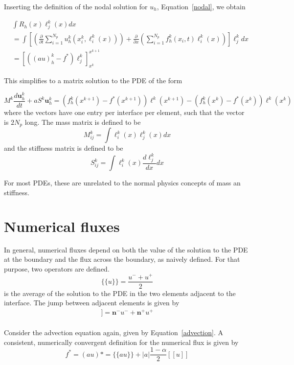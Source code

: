 \documentclass{article}
\begin{document}
Inserting the definition of the nodal solution for $u_h$,
Equation~\ref{nodal}, we obtain

\begin{eqnarray}
&\int R_h(x)\ell_j^k(x)dx\\
&=\displaystyle\int\left[\left(\frac{\partial}{\partial t}\sum_{i=1}^{N_p}
u_h^k(x_i^k,\ell_i^k(x))\right)
+\frac{\partial}{\partial x}\left(\sum_{i=1}^{N_p}f_h^k(x_i,t)\ell_i^k(x)\right)\right]\ell_j^kdx\\
&=[((au)_h^k-f^*)\ell_j^k]_{x^k}^{x^{k+1}}
\end{eqnarray}

This simplifies to a matrix solution to the PDE of the form

\begin{equation}
M^k\frac{d\boldsymbol{u}_h^k}{dt}+aS^k\boldsymbol{u}^k_h=
(f^k_h(x^{k+1})-f^*(x^{k+1}))\ell^k(x^{k+1})
-(f_h^k(x^k)-f^*(x^k))\ell^k(x^k)
\end{equation}
where the vectors have one entry per interface per element, such that
the vector is $2N_p$ long. The mass matrix is defined to be
\begin{equation}
M^k_{ij}=\int\ell^k_i(x)\ell^k_j(x)dx
\label{mass}
\end{equation}
and the stiffness matrix is defined to be
\begin{equation}
S^k_{ij}=\int\ell^k_i(x)\frac{d\ell^k_j}{dx}dx
\label{stiffness}
\end{equation}

For most PDEs, these are unrelated to the normal physics concepts of
mass an stiffness.

\section{Numerical fluxes}
In general, numerical fluxes depend on both the value of the solution
to the PDE at the boundary and the flux across the boundary, as
naively defined. For that purpose, two operators are defined.
\begin{equation}
\{\{u\}\} =\frac{u^-+u^+}{2}
\end{equation}
is the average of the solution to the PDE in the two elements adjacent
to the interface. The jump between adjacent elements is given by 
\begin{eqnarray}
[[\boldsymbol{u}]]=\boldsymbol{n}^-u^-+\boldsymbol{n}^+u^+\\
\end{eqnarray}

Consider the advection equation again, given by Equation~\ref{advection}. 
A consistent, numerically convergent
definition for the numerical flux is given by
\begin{equation}
f^*=(au)*=\{\{au\}\}+|a|\frac{1-\alpha}{2}[[u]]
\label{advectionflux}
\end{equation}
\end{document}
